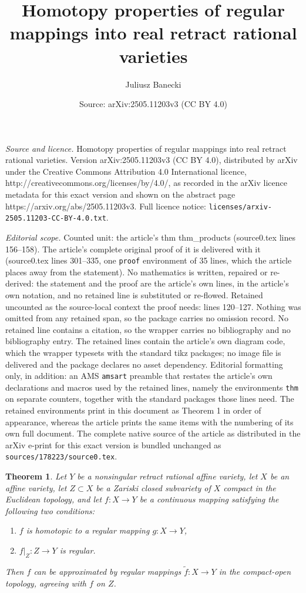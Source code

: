 \documentclass[10pt,a4paper]{amsart}
\title{Homotopy properties of regular mappings into real retract rational varieties}
\author{Juliusz Banecki}
\date{Source: arXiv:2505.11203v3 (CC BY 4.0)}
\newtheorem{thm}{Theorem}
\begin{document}
\maketitle

\noindent\emph{Source and licence.} Homotopy properties of regular mappings into real retract rational varieties. Version arXiv:2505.11203v3 (CC BY 4.0), distributed by arXiv under the Creative Commons Attribution 4.0 International licence, http://creativecommons.org/licenses/by/4.0/, as recorded in the arXiv licence metadata for this exact version and shown on the abstract page https://arxiv.org/abs/2505.11203v3. Full licence notice: \texttt{licenses/arxiv-2505.11203-CC-BY-4.0.txt}.\par\smallskip

\noindent\textit{Editorial scope.} Counted unit: the article's thm thm\_products (source0.tex lines 156--158). The article's complete original proof of it is delivered with it (source0.tex lines 301--335, one \texttt{proof} environment of 35 lines, which the article places away from the statement). No mathematics is written, repaired or re-derived: the statement and the proof are the article's own lines, in the article's own notation, and no retained line is substituted or re-flowed.  Retained uncounted as the source-local context the proof needs: lines 120--127.  Nothing was omitted from any retained span, so the package carries no omission record.  No retained line contains a citation, so the wrapper carries no bibliography and no bibliography entry.  The retained lines contain the article's own diagram code, which the wrapper typesets with the standard tikz packages; no image file is delivered and the package declares no asset dependency.  Editorial formatting only, in addition: an AMS \texttt{amsart} preamble that restates the article's own declarations and macros used by the retained lines, namely the environments \texttt{thm} on separate counters, together with the standard packages those lines need.  The retained environments print in this document as Theorem 1 in order of appearance, whereas the article prints the same items with the numbering of its own full document.  The complete native source of the article as distributed in the arXiv e-print for this exact version is bundled unchanged as \texttt{sources/178223/source0.tex}.
\begin{thm}\label{approx_thm}
Let $Y$ be a nonsingular retract rational affine variety, let $X$ be an affine variety, let $Z\subset X$ be a Zariski closed subvariety of $X$ compact in the Euclidean topology, and let $f:X\rightarrow Y$ be a continuous mapping satisfying the following two conditions:
\begin{enumerate}
    \item $f$ is homotopic to a regular mapping $g:X\rightarrow Y$,
    \item $f\vert_Z:Z\rightarrow Y$ is regular. 
\end{enumerate}
Then $f$ can be approximated by regular mappings $\widetilde{f}:X\rightarrow Y$ in the compact-open topology, agreeing with $f$ on $Z$.
\end{thm}
\end{document}
